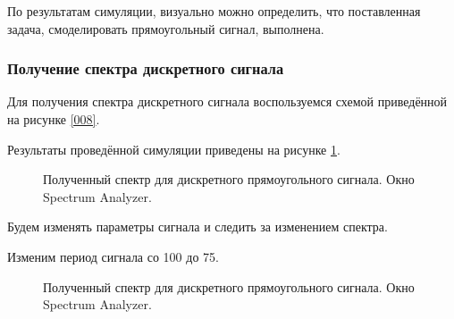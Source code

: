 \documentclass[a4paper,14pt]{extarticle}
\begin{document}
По результатам симуляции, визуально можно определить, что 
поставленная задача, смоделировать прямоугольный сигнал, 
выполнена.

\subsubsection{Получение спектра дискретного сигнала}

Для получения спектра дискретного сигнала воспользуемся схемой 
приведённой на рисунке \ref{008}.

Результаты проведённой симуляции приведены на рисунке \ref{011}.

\begin{figure}[H]
\caption{Полученный спектр для дискретного прямоугольного 
сигнала. Окно Spectrum Analyzer.}
\label{011}
\end{figure}

Будем изменять параметры сигнала и следить за изменением спектра.

Изменим период сигнала со 100 до 75.

\begin{figure}[H]
\caption{Полученный спектр для дискретного прямоугольного 
сигнала. Окно Spectrum Analyzer.}
\label{012}
\end{figure}
\end{document}
